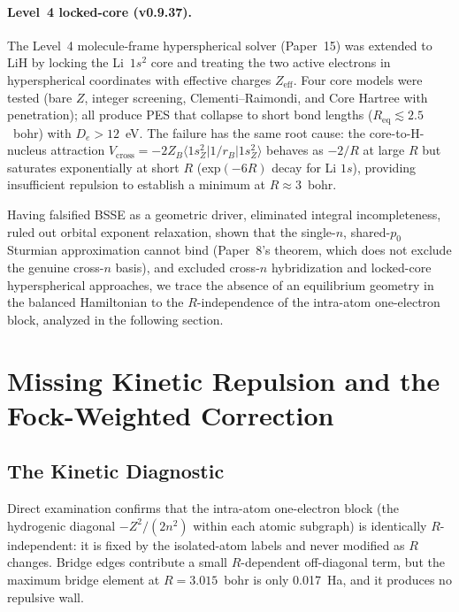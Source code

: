 \documentclass[aps,pra,twocolumn,superscriptaddress,longbibliography]{revtex4-2}
\begin{document}
\paragraph{Level~4 locked-core (v0.9.37).}
The Level~4 molecule-frame hyperspherical solver (Paper~15) was extended
to LiH by locking the Li~$1s^2$ core and treating the two active
electrons in hyperspherical coordinates with effective charges
$Z_{\mathrm{eff}}$.  Four core models were tested (bare $Z$, integer
screening, Clementi--Raimondi, and Core Hartree with penetration); all
produce PES that collapse to short bond lengths
($R_{\mathrm{eq}} \lesssim 2.5$~bohr) with $D_e > 12$~eV.  The failure has the same root cause:
the core-to-H-nucleus attraction $V_{\mathrm{cross}} = -2Z_B\langle
1s^2_Z | 1/r_B | 1s^2_Z \rangle$ behaves as $-2/R$ at large $R$ but
saturates exponentially at short $R$ (exp$(-6R)$ decay for Li $1s$),
providing insufficient repulsion to establish a minimum at
$R \approx 3$~bohr.

\medskip

Having falsified BSSE as a geometric driver, eliminated integral
incompleteness, ruled out orbital exponent relaxation, shown that the
single-$n$, shared-$p_0$ Sturmian approximation cannot bind (Paper~8's
theorem, which does not exclude the genuine cross-$n$ basis), and
excluded cross-$n$ hybridization and locked-core hyperspherical
approaches, we trace the absence of an equilibrium geometry in the
balanced Hamiltonian to the $R$-independence of the intra-atom
one-electron block, analyzed in the following section.

\section{Missing Kinetic Repulsion and the Fock-Weighted Correction}
\label{sec:kinetic}

\subsection{The Kinetic Diagnostic}
\label{sec:kinetic_diagnostic}

Direct examination confirms that the intra-atom one-electron block (the
hydrogenic diagonal $-Z^2/(2n^2)$ within each atomic subgraph) is
identically $R$-independent: it is fixed by the isolated-atom labels and
never modified as $R$ changes.  Bridge edges contribute a small
$R$-dependent off-diagonal term, but the maximum bridge element at
$R=3.015$~bohr is only 0.017~Ha, and it produces no repulsive wall.
\end{document}
